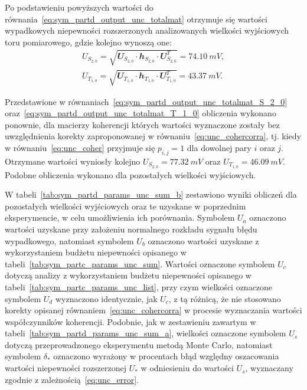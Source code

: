 Po podstawieniu powyższych wartości do równania~\eqref{eq:sym_partd_output_unc_totalmat} otrzymuje się wartości wypadkowych niepewności rozszerzonych analizowanych wielkości wyjściowych toru pomiarowego, gdzie kolejno wynoszą one:
\begin{gather}
U_{S_{2,0}} = \sqrt{\mathbfit{U}_{S_{2,0}} \cdot \mathbfit{h}_{S_{2,0}} \cdot \mathbfit{U}_{S_{2,0}}^{T}} = \qty{74.10}{mV} \label{eq:sym_partd_output_unc_totalmat_S_2_0}, \\
U_{T_{1,0}} = \sqrt{\mathbfit{U}_{T_{1,0}} \cdot \mathbfit{h}_{T_{1,0}} \cdot \mathbfit{U}_{T_{1,0}}^{T}} = \qty{43.37}{mV} \label{eq:sym_partd_output_unc_totalmat_T_1_0}.
\end{gather}

Przedstawione w równaniach~\eqref{eq:sym_partd_output_unc_totalmat_S_2_0} oraz~\eqref{eq:sym_partd_output_unc_totalmat_T_1_0} obliczenia wykonano ponownie, dla macierzy koherencji których wartości wyznaczone zostały bez uwzględnienia korekty zaproponowanej w równaniu~\eqref{eq:unc_cohercorra}, tj. kiedy w równaniu~\eqref{eq:unc_coher} przyjmuje się $p_{i,j} = 1$ dla dowolnej pary $i$ oraz $j$. Otrzymane wartości wyniosły kolejno $U_{S_{2,0}} = \qty{77.32}{mV}$ oraz $U_{T_{1,0}} = \qty{46.09}{mV}$. Podobne obliczenia wykonano dla pozostałych wielkości wyjściowych.

W tabeli~\ref{tab:sym_partd_params_unc_sum_b} zestawiono wyniki obliczeń dla pozostałych wielkości wyjściowych oraz te uzyskane w poprzednim eksperymencie, w celu umożliwienia ich porównania. Symbolem $U_{a}$ oznaczono wartości uzyskane przy założeniu normalnego rozkładu sygnału błędu wypadkowego, natomiast symbolem $U_{b}$ oznaczono wartości uzyskane z wykorzystaniem budżetu niepewności opisanego w tabeli~\ref{tab:sym_partc_params_unc_sum}. Wartości oznaczone symbolem $U_{c}$ dotyczą analizy z wykorzystaniem budżetu niepewności opisanego w tabeli~\ref{tab:sym_partc_params_unc_list}, przy czym wielkości oznaczone symbolem $U_{d}$ wyznaczono identycznie, jak $U_{c}$, z tą różnicą, że nie stosowano korekty opisanej równaniem~\eqref{eq:unc_cohercorra} w procesie wyznaczania wartości współczynników koherencji. Podobnie, jak w zestawieniu zawartym w tabeli~\ref{tab:sym_partd_params_unc_sum_a}, wielkości oznaczone symbolem $U_{s}$ dotyczą przeprowadzonego eksperymentu metodą Monte Carlo, natomiast symbolem $\delta_{*}$ oznaczono wyrażony w procentach błąd względny oszacowania wartości niepewności rozszerzonej $U_{*}$ w odniesieniu do wartości $U_{s}$, wyznaczany zgodnie z zależnością~\eqref{eq:unc_error}.

